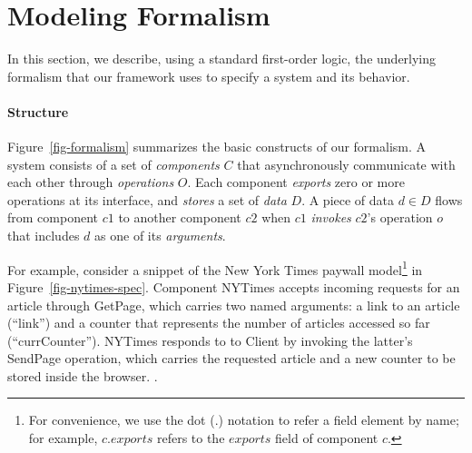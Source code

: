 \def\strlit#1{\textsf{\scriptsize ``#1''}}
\def\cname#1{\textsf{#1}}
\def\mcom#1{{\color{comment} // #1}}

\section{Modeling Formalism}
\label{sec-formalism}

In this section, we describe, using a standard first-order logic, the
underlying formalism that our framework uses to specify a system and
its behavior. 

\paragraph{\textbf{Structure}} Figure~\ref{fig-formalism} summarizes
the basic constructs of our formalism. A system consists of a set of
\textit{components} $C$ that asynchronously communicate with each
other through \textit{operations} $O$. Each component \textit{exports} zero or
more operations at its interface, and \textit{stores} a set of
\textit{data} $D$. A piece of data $d \in D$ flows from component $c1$
to another component $c2$ when $c1$ \textit{invokes} $c2$'s operation
$o$ that includes $d$ as one of its \textit{arguments}. 

For example, consider a snippet of the New York Times paywall
model\footnote{For convenience, we use the dot (.)  notation to refer
  a field element by name; for example, $c.exports$ refers to the
  $exports$ field of component $c$.} in
Figure~\ref{fig-nytimes-spec}. Component \cname{NYTimes} accepts
incoming requests for an article through \cname{GetPage}, which
carries two named arguments: a link to an article (\strlit{link})
and a counter that represents the number of articles accessed so far
(\strlit{currCounter}). \cname{NYTimes} responds to to
\cname{Client} by invoking the latter's \cname{SendPage} operation,
which carries the requested article and a new counter to be stored
inside the browser. .

